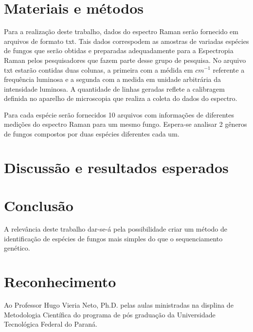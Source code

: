 \documentclass[conference,peerreview]{IEEEtran}
\begin{document}
\section{Materiais e métodos}

Para a realização deste trabalho, dados do espectro Raman serão fornecido em arquivos de formato txt. Tais dados correspodem as amostras de variadas espécies de fungos que serão obtidas e preparadas adequadamente para a Espectropia Raman pelos pesquisadores que fazem parte desse grupo de pesquisa. No arquivo txt estarão contidas duas colunas, a primeira com a médida em $cm^{-1}$ referente a frequência luminosa e a segunda com a medida em unidade arbitrária da intensidade luminosa. A quantidade de linhas geradas reflete a calibragem definida no aparelho de microscopia que realiza a coleta do dados do espectro.

Para cada espécie serão fornecidos 10 arquivos com informações de diferentes medições do espectro Raman para um mesmo fungo. Espera-se analisar 2 gêneros de fungos compostos por duas espécies diferentes cada um.

\section{Discussão e resultados esperados}

\section{Conclusão}

A relevância deste trabalho dar-se-á pela possibilidade criar um método de identificação de espécies de fungos mais simples do que o sequenciamento genético. 

\section*{Reconhecimento}

Ao Professor Hugo Vieria Neto, Ph.D. pelas aulas ministradas na displina de Metodologia Científica do programa de pós graduação da Universidade Tecnológica Federal do Paraná.



\end{document}
